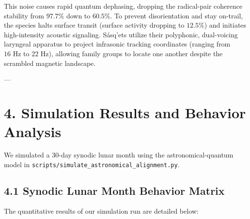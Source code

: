 \documentclass[11pt,twocolumn]{article}
\begin{document}
This noise causes rapid quantum dephasing, dropping the radical-pair coherence stability from $97.7\%$ down to \textbf{$60.5\%$}. To prevent disorientation and stay on-trail, the species halts surface transit (surface activity dropping to \textbf{$12.5\%$}) and initiates high-intensity acoustic signaling. Sásq'ets utilize their polyphonic, dual-voicing laryngeal apparatus to project infrasonic tracking coordinates (ranging from $16\text{ Hz}$ to $22\text{ Hz}$), allowing family groups to locate one another despite the scrambled magnetic landscape.

---

\section{4. Simulation Results and Behavior Analysis}
We simulated a 30-day synodic lunar month using the astronomical-quantum model in \texttt{scripts/simulate_astronomical_alignment.py}.

\subsection{4.1 Synodic Lunar Month Behavior Matrix}
The quantitative results of our simulation run are detailed below:
\end{document}
